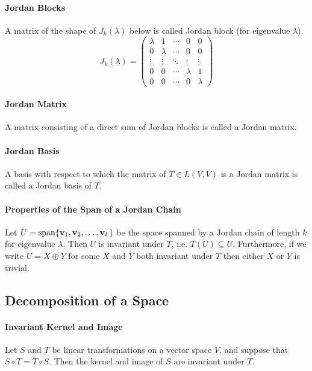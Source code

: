 \paragraph{Jordan Blocks}
A matrix of the shape of \(J_k(\lambda)\) below is called  Jordan block (for eigenvalue \(\lambda\)).
\[J_k(\lambda) = \begin{pmatrix}
    \lambda & 1 & \cdots & 0 & 0 \\
    0 & \lambda & \cdots & 0 & 0 \\
    \vdots & \vdots & \ddots & \vdots & \vdots \\
    0 & 0 & \cdots & \lambda & 1 \\
    0 & 0 & \cdots & 0 & \lambda
\end{pmatrix}\]

\paragraph{Jordan Matrix}
A matrix consisting of a direct sum of Jordan blocks is called a Jordan matrix.

\paragraph{Jordan Basis}
A basis with respect to which the matrix of \(T \in L(V,V)\) is a Jordan matrix is called a Jordan basis of \(T\).

\paragraph{Properties of the Span of a Jordan Chain}
Let \(U = \mathrm{span}\{\mathbf{v}_1, \mathbf{v}_2, \dots, \mathbf{v}_k\}\) be the space spanned by a Jordan chain of length \(k\) for eigenvalue \(\lambda\). Then \(U\) is invariant under \(T\), i.e. \(T(U) \subseteq U\). Furthermore, if we write \(U = X \oplus Y\) for some \(X\) and \(Y\) both invariant under \(T\) then either \(X\) or \(Y\) is trivial.

\subsection{Decomposition of a Space}
\paragraph{Invariant Kernel and Image}
Let \(S\) and \(T\) be linear transformations on a vector space \(V\), and suppose that \(S \circ T = T \circ S\). Then the kernel and image of \(S\) are invariant under \(T\).

